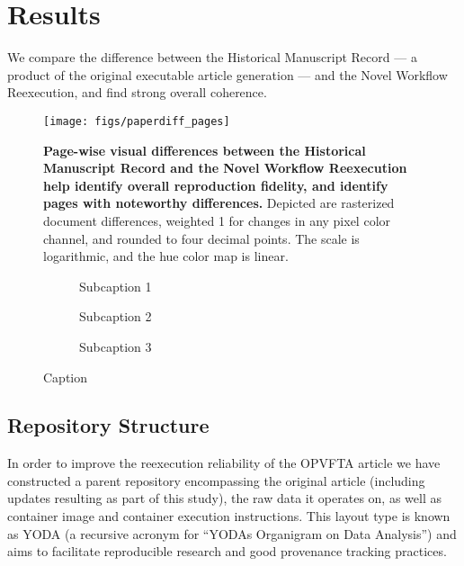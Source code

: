 \section{Results}
We compare the difference between the Historical Manuscript Record — a product of the original executable article generation — and the Novel Workflow Reexecution, and find strong overall coherence.

\begin{figure}
	\centering
	\texttt{[image: figs/paperdiff\_pages]}
	\caption{
		\textbf{Page-wise visual differences between the Historical Manuscript Record and the Novel Workflow Reexecution help identify overall reproduction fidelity, and identify pages with noteworthy differences.}
		Depicted are rasterized document differences, weighted 1 for changes in any pixel color channel, and rounded to four decimal points.
		The scale is logarithmic, and the hue color map is linear.
	}
	\label{fig:paperdiff_pages}
\end{figure}

\begin{figure}
	\centering
	\begin{subfigure}
		\texttt{[image: figs/diff\_date]}
		\caption{
			Subcaption 1
		}
		\label{fig:diff_date}
	\end{subfigure}
	\begin{subfigure}
		\texttt{[image: figs/diff\_text]}
		\caption{
			Subcaption 2
		}
		\label{fig:diff_text}
	\end{subfigure}
	\begin{subfigure}
		\texttt{[image: figs/diff\_fig]}
		\caption{
			Subcaption 3
		}
		\label{fig:diff_fig}
	\end{subfigure}
	\caption{
		Caption
	}
\end{figure}


\subsection{Repository Structure}
In order to improve the reexecution reliability of the OPVFTA article we have constructed a parent repository encompassing the original article (including updates resulting as part of this study), the raw data it operates on, as well as container image and container execution instructions.
This layout type is known as YODA (a recursive acronym for “YODAs Organigram on Data Analysis”) and aims to facilitate reproducible research and good provenance tracking practices.

